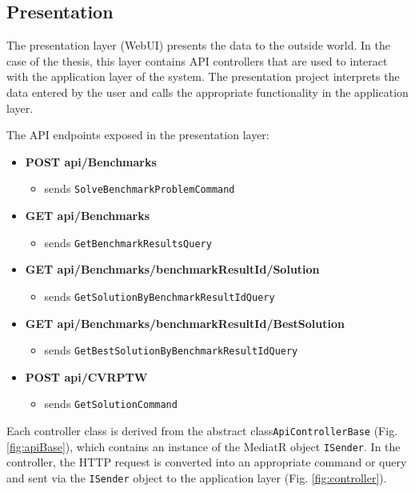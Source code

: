 \documentclass[a4paper,twoside,12pt]{book}
\begin{document}
\subsection{Presentation}

The presentation layer (WebUI) presents the data to the outside world. In the case of the thesis, this layer contains API controllers that are used to interact with the application layer of the system. The presentation project interprets the data entered by the user and calls the appropriate functionality in the application layer. 

The API endpoints exposed in the presentation layer:
\begin{itemize}
    \item \textbf{POST api/Benchmarks}
     \begin{itemize}
     \item sends \lstinline{SolveBenchmarkProblemCommand}
     \end{itemize}
    \item \textbf{GET api/Benchmarks}
    \begin{itemize}
     \item sends \lstinline{GetBenchmarkResultsQuery}
     \end{itemize}
    \item \textbf{GET api/Benchmarks/{benchmarkResultId}/Solution}
      \begin{itemize}
     \item sends \lstinline{GetSolutionByBenchmarkResultIdQuery} 
     \end{itemize} 
    \item \textbf{GET api/Benchmarks/{benchmarkResultId}/BestSolution}
    \begin{itemize}
     \item sends \lstinline{GetBestSolutionByBenchmarkResultIdQuery} 
     \end{itemize}  
    \item \textbf{POST api/CVRPTW}
        \begin{itemize}
     \item sends \lstinline{GetSolutionCommand} 
     \end{itemize} 
\end{itemize}

Each controller class is derived from the abstract class\lstinline{ApiControllerBase} (Fig. \ref{fig:apiBase}), which contains an instance of the MediatR object \lstinline{ISender}. In the controller, the HTTP request is converted into an appropriate command or query and sent via the \lstinline{ISender} object to the application layer (Fig. \ref{fig:controller}).
\end{document}
